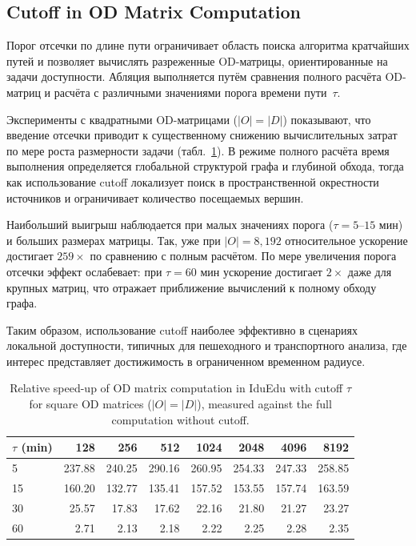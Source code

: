 \documentclass[sigconf,nonacm]{acmart}
\begin{document}
    \subsection{Cutoff in OD Matrix Computation}
    \label{subsec:cutoff-in-od-matrix-computation}

    Порог отсечки по длине пути ограничивает область поиска алгоритма кратчайших путей и позволяет вычислять разреженные OD-матрицы, ориентированные на задачи доступности.
    Абляция выполняется путём сравнения полного расчёта OD-матриц и расчёта с различными значениями порога времени пути~$\tau$.

    Эксперименты с квадратными OD-матрицами ($|O| = |D|$) показывают, что введение отсечки приводит к существенному
    снижению вычислительных затрат по мере роста размерности задачи (табл.~\ref{tab:od_cutoff_square}).
    В режиме полного расчёта время выполнения определяется глобальной структурой графа и глубиной обхода,
    тогда как использование cutoff локализует поиск в пространственной окрестности источников и ограничивает количество посещаемых вершин.

    Наибольший выигрыш наблюдается при малых значениях порога ($\tau = 5$–$15$ мин) и больших размерах матрицы.
    Так, уже при $|O| = 8{,}192$ относительное ускорение достигает $259\times$ по сравнению с полным расчётом.
    По мере увеличения порога отсечки эффект ослабевает: при $\tau = 60$ мин ускорение достигает $2\times$ даже для крупных матриц,
    что отражает приближение вычислений к полному обходу графа.

    Таким образом, использование cutoff наиболее эффективно в сценариях локальной доступности, типичных для пешеходного
    и транспортного анализа, где интерес представляет достижимость в ограниченном временном радиусе.

    \begin{table}
        \centering
        \caption{Relative speed-up of OD matrix computation in IduEdu with cutoff $\tau$
            for square OD matrices ($|O|=|D|$), measured against the full computation without cutoff.}
        \label{tab:od_cutoff_square}
        \small
        \begin{tabular}{lrrrrrrr}
            \toprule
            $\tau$ (min) & 128    & 256    & 512    & 1024   & 2048   & 4096   & 8192   \\
            \midrule
            5            & 237.88 & 240.25 & 290.16 & 260.95 & 254.33 & 247.33 & 258.85 \\
            15           & 160.20 & 132.77 & 135.41 & 157.52 & 153.55 & 157.74 & 163.59 \\
            30           & 25.57  & 17.83  & 17.62  & 22.16  & 21.80  & 21.27  & 23.27  \\
            60           & 2.71   & 2.13   & 2.18   & 2.22   & 2.25   & 2.28   & 2.35   \\
            \bottomrule
        \end{tabular}
    \end{table}
\end{document}
